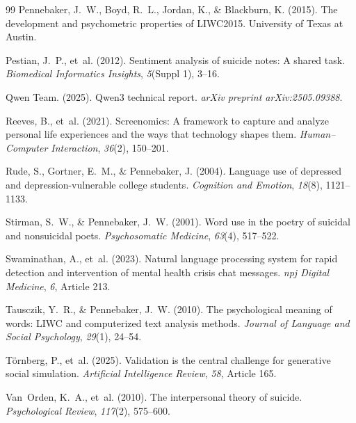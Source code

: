 \documentclass[review,12pt,authoryear]{elsarticle}
\begin{document}
\begin{thebibliography}{99}
Pennebaker, J.~W., Boyd, R.~L., Jordan, K., \& Blackburn, K. (2015).
\newblock The development and psychometric properties of {LIWC2015}.
\newblock University of Texas at Austin.

Pestian, J.~P., et~al. (2012).
\newblock Sentiment analysis of suicide notes: {A} shared task.
\newblock \textit{Biomedical Informatics Insights}, \textit{5}(Suppl 1), 3--16.

Qwen Team. (2025).
\newblock Qwen3 technical report.
\newblock \textit{arXiv preprint arXiv:2505.09388}.

Reeves, B., et~al. (2021).
\newblock Screenomics: {A} framework to capture and analyze personal life experiences and the ways that technology shapes them.
\newblock \textit{Human--Computer Interaction}, \textit{36}(2), 150--201.

Rude, S., Gortner, E.~M., \& Pennebaker, J. (2004).
\newblock Language use of depressed and depression-vulnerable college students.
\newblock \textit{Cognition and Emotion}, \textit{18}(8), 1121--1133.

Stirman, S.~W., \& Pennebaker, J.~W. (2001).
\newblock Word use in the poetry of suicidal and nonsuicidal poets.
\newblock \textit{Psychosomatic Medicine}, \textit{63}(4), 517--522.

Swaminathan, A., et~al. (2023).
\newblock Natural language processing system for rapid detection and intervention of mental health crisis chat messages.
\newblock \textit{npj Digital Medicine}, \textit{6}, Article 213.

Tausczik, Y.~R., \& Pennebaker, J.~W. (2010).
\newblock The psychological meaning of words: {LIWC} and computerized text analysis methods.
\newblock \textit{Journal of Language and Social Psychology}, \textit{29}(1), 24--54.

T{\"o}rnberg, P., et~al. (2025).
\newblock Validation is the central challenge for generative social simulation.
\newblock \textit{Artificial Intelligence Review}, \textit{58}, Article 165.

Van~Orden, K.~A., et~al. (2010).
\newblock The interpersonal theory of suicide.
\newblock \textit{Psychological Review}, \textit{117}(2), 575--600.


\end{thebibliography}
\end{document}
